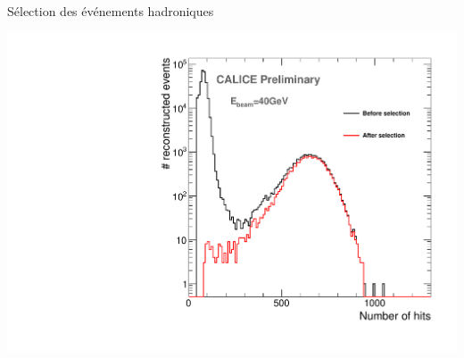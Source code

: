 \documentclass[8pt]{beamer}
\begin{document}
\begin{frame}
\begin{minipage}{0.6\linewidth}
\begin{block}{Sélection des événements hadroniques}
      \end{block}
    \end{minipage} \hfill
    \begin{minipage}{0.38\linewidth}
      \includegraphics[width=\linewidth]{sdhcal_hadron_selection_40GeV.pdf}
    \end{minipage}
  \end{frame}
  
\end{document}
